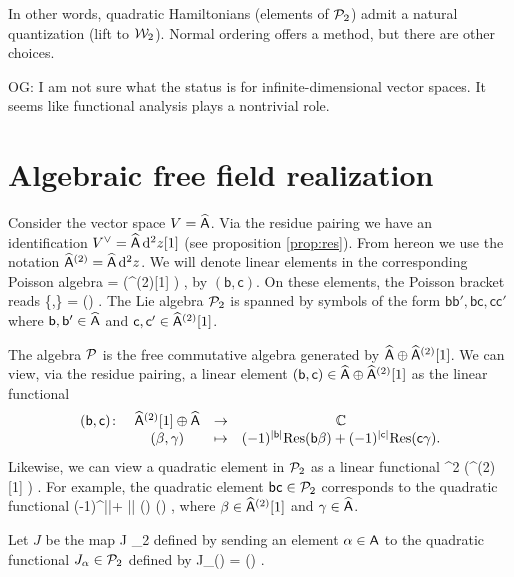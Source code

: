 \documentclass[11pt]{amsart}
\def\C{{\mathbb{C}}}
\newcommand{\laurent}{\Hat \sfA}
\newcommand{\sfb}{\mathsf{b}}
\newcommand{\sfc}{\mathsf{c}}
\def\owen#1{{\textcolor{violet!65!black}{OG: {#1}}}}
\begin{document}
In other words, quadratic Hamiltonians (elements of $\mathcal P_2$) admit a natural quantization (lift to $\mathcal W_2$).
Normal ordering offers a method, but there are other choices.

\owen{I am not sure what the status is for infinite-dimensional vector spaces. It seems like functional analysis plays a nontrivial role.}

\section{Algebraic free field realization}

Consider the vector space $V = \laurent$.
Via the residue pairing we have an identification $V^\vee = \laurent \, \d^2 z [1]$ (see proposition \ref{prop:res}).
From hereon we use the notation $\laurent^{(2)} = \laurent \, \d^2 z$.
We will denote linear elements in the corresponding Poisson algebra
\beqn
\cP = \Sym \left(\laurent  \oplus \laurent^{(2)}[1] \right) ,
\eeqn
by $(\sfb , \sfc)$.
On these elements, the Poisson bracket reads
\beqn
\{\sfb ,\sfc\} = \Res(\sfb \sfc) .
\eeqn
The Lie algebra $\mathcal P_2$ is spanned by symbols of the form $\sfb \sfb',\sfb \sfc, \sfc \sfc'$ where $\sfb,\sfb'\in \laurent$ and $\sfc,\sfc' \in \laurent^{(2)}[1]$.

The algebra $\mathcal P$ is the free commutative algebra generated by $\laurent \oplus \laurent^{(2)}[1]$.
We can view, via the residue pairing, a linear element $(\sfb, \sfc) \in \laurent \oplus \laurent^{(2)}[1]$ as the linear functional
\[
\begin{array}{cccc}
(\sfb, \sfc) \colon & \laurent^{(2)} [1] \oplus \laurent & \to & \C\\
& (\beta, \gamma) & \mapsto  &(-1)^{|\sfb|} \Res(\sfb \beta) + (-1)^{|\sfc|} \Res(\sfc \gamma) .
\end{array}
\]
Likewise, we can view a quadratic element in $\mathcal P_2$ as a linear functional
\beqn
\Sym^2 \left(\laurent^{(2)} [1] \oplus \laurent \right) \to \C .
\eeqn
For example, the quadratic element $\sfb \sfc \in \cP_2$ corresponds to the quadratic functional
\beqn
\beta \gamma \mapsto (-1)^{|\sfb|+ |\sfc|} \Res (\sfb \beta) \Res(\sfc \gamma) ,
\eeqn
where $\beta \in \laurent^{(2)} [1]$ and $\gamma \in \laurent$.

Let $J$ be the map
\beqn
J \colon \laurent \to \cP_2
\eeqn
defined by sending an element $\alpha \in \mathsf A$ to the quadratic functional $J_\alpha \in \mathcal P_2$ defined by
\beqn
J_\alpha (\beta \gamma) = \Res(\beta \alpha \gamma) .
\eeqn
\end{document}
